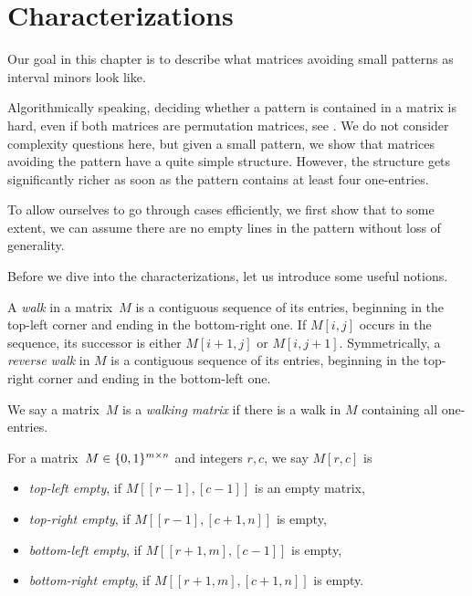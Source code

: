 \newsavebox{\smlmat}
\savebox{\smlmat}{$\smm{\bullet&\bullet\\\bullet& }$}
\newsavebox{\smlmatb}
\savebox{\smlmatb}{$\smm{\bullet&\bullet\\\bullet&\bullet}$}
\newsavebox{\smlmatc}
\savebox{\smlmatc}{$\smm{\bullet&\bullet&\bullet\\ &\bullet& }$}

\chapter{Characterizations}
\label{chap:chars}
Our goal in this chapter is to describe what matrices avoiding small patterns as interval minors look like.

Algorithmically speaking, deciding whether a pattern is contained in a matrix is hard, even if both matrices are permutation matrices, see \cite{complex}. We do not consider complexity questions here, but given a small pattern, we show that matrices avoiding the pattern have a quite simple structure. However, the structure gets significantly richer as soon as the pattern contains at least four one-entries.

To allow ourselves to go through cases efficiently, we first show that to some extent, we can assume there are no empty lines in the pattern without loss of generality.

Before we dive into the characterizations, let us introduce some useful notions.

\begin{defn}
A \emph{walk} in a matrix~$M$ is a contiguous sequence of its entries, beginning in the top-left corner and ending in the bottom-right one. If $M[i,j]$ occurs in the sequence, its successor is either $M[i+1,j]$ or $M[i,j+1]$. Symmetrically, a \emph{reverse walk} in $M$ is a contiguous sequence of its entries, beginning in the top-right corner and ending in the bottom-left one.
\end{defn}

\begin{defn}
We say a matrix~$M$ is a \emph{walking matrix} if there is a walk in $M$ containing all one-entries.
\end{defn}

\begin{defn}
For a matrix~$M\in\{0,1\}^{m\times n}$ and integers $r,c$, we say $M[r,c]$ is
\begin{itemize}
	\item \emph{top-left empty}, if $M[[r-1],[c-1]]$ is an empty matrix,
	\item \emph{top-right empty}, if $M[[r-1],[c+1,n]]$ is empty,
	\item \emph{bottom-left empty}, if $M[[r+1,m],[c-1]]$ is empty,
	\item \emph{bottom-right empty}, if $M[[r+1,m],[c+1,n]]$ is empty.
\end{itemize}
\end{defn}

